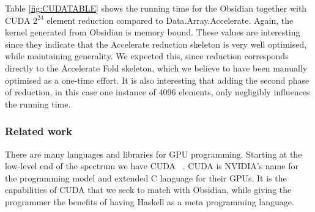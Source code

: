 Table \ref{fig:CUDATABLE} shows the running time for the Obsidian together with 
CUDA $2^{24}$ element reduction compared to Data.Array.Accelerate. 
Again, the kernel generated from Obsidian is memory bound.
These values are 
interesting since they indicate that the Accelerate reduction skeleton is 
very well optimised, while maintaining generality. We expected this, since 
reduction corresponds directly to the Accelerate Fold skeleton, which
we believe to have been manually optimised as a one-time effort. It is also 
interesting that adding the second phase of reduction, in this case 
one instance of 4096 elements, only negligibly influences the running time.




\subsubsection{Related work}

There are many languages and libraries for GPU programming. Starting at the 
low-level end of the spectrum we have CUDA ~\cite{CUDA}. CUDA is NVIDIA's 
name for the programming model and extended C language for their GPUs. 
It is 
the capabilities of CUDA that we seek to match with Obsidian,
while giving the programmer the benefits of having Haskell as a meta programming 
language. 


